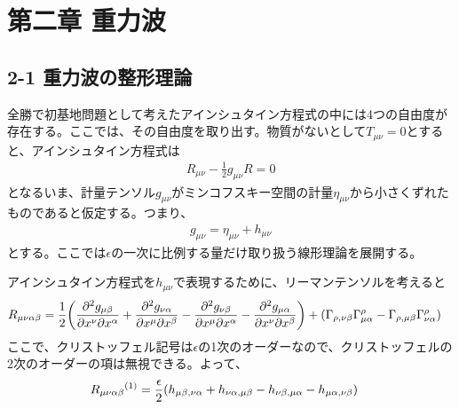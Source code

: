 \documentclass[autodetect-engine,dvi=dvipdfmx,ja=standard, 10pt, a4paper]{bxjsarticle}
\begin{document}
\section*{第二章 重力波}
\subsection*{2-1 重力波の整形理論}
全勝で初基地問題として考えたアインシュタイン方程式の中には4つの自由度が存在する。ここでは、その自由度を取り出す。物質がないとして$T_{\mu\nu}=0$とすると、アインシュタイン方程式は
\begin{align}
	R_{\mu\nu} - \frac{1}{2}g_{\mu\nu}R = 0
\end{align}
となるいま、計量テンソル$g_{\mu\nu}$がミンコフスキー空間の計量$\eta_{\mu\nu}$から小さくずれたものであると仮定する。つまり、
\begin{align}
	g_{\mu\nu} = \eta_{\mu\nu} + h_{\mu\nu}
\end{align}
とする。ここでは$\epsilon$の一次に比例する量だけ取り扱う線形理論を展開する。

アインシュタイン方程式を$h_{\mu\nu}$で表現するために、リーマンテンソルを考えると
\begin{align}
	R_{\mu\nu\alpha\beta} &= \frac{1}{2}\qty(\pdv{^2 g_{\mu\beta}}{x^\nu \partial x^\alpha} + \pdv{^2 g_{\nu\alpha}}{x^\mu \partial x^\beta}  - \pdv{^2 g_{\nu\beta}}{x^\mu \partial x^\alpha}- \pdv{^2 g_{\mu\alpha}}{x^\nu \partial x^\beta}) + (\Gamma_{\rho,\nu\beta}\Gamma^\rho_{\mu\alpha} - \Gamma_{\rho,\mu\beta}\Gamma^\rho_{\nu\alpha})
\end{align}
ここで、クリストッフェル記号は$\epsilon$の1次のオーダーなので、クリストッフェルの2次のオーダーの項は無視できる。よって、
\begin{align}
	R_{\mu\nu\alpha\beta} {}^{(1)}&= \frac{\epsilon}{2}\qty(h_{\mu\beta,\nu\alpha} + h_{\nu\alpha,\mu\beta} - h_{\nu\beta,\mu\alpha}- h_{\mu\alpha,\nu\beta})
\end{align}
\end{document}

